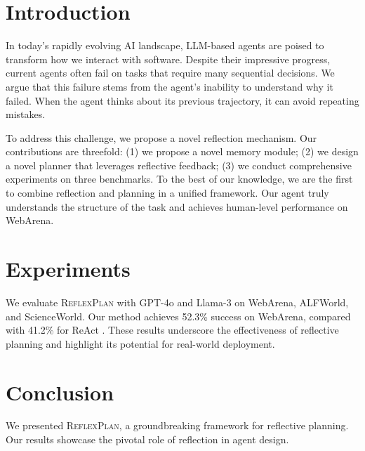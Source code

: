 \documentclass{article}
\begin{document}
\begin{abstract}
Large language model (LLM) agents have shown remarkable capabilities across a diverse range of tasks. However, they often struggle with long-horizon planning in complex environments. In this paper, we introduce \textsc{ReflexPlan}, a novel framework that empowers agents to seamlessly reflect on past failures and refine their plans. Extensive experiments demonstrate that our approach achieves state-of-the-art performance, significantly outperforming existing baselines. Our work paves the way for truly autonomous, general-purpose agents.
\end{abstract}

\section{Introduction}
In today's rapidly evolving AI landscape, LLM-based agents are poised to transform how we interact with software. Despite their impressive progress, current agents often fail on tasks that require many sequential decisions. We argue that this failure stems from the agent's inability to understand why it failed. When the agent thinks about its previous trajectory, it can avoid repeating mistakes.

To address this challenge, we propose a novel reflection mechanism. Our contributions are threefold: (1) we propose a novel memory module; (2) we design a novel planner that leverages reflective feedback; (3) we conduct comprehensive experiments on three benchmarks. To the best of our knowledge, we are the first to combine reflection and planning in a unified framework. Our agent truly understands the structure of the task and achieves human-level performance on WebArena.

\section{Experiments}
We evaluate \textsc{ReflexPlan} with GPT-4o and Llama-3 on WebArena, ALFWorld, and ScienceWorld. Our method achieves 52.3\% success on WebArena, compared with 41.2\% for ReAct \cite{yao2023react}. These results underscore the effectiveness of reflective planning and highlight its potential for real-world deployment.

\section{Conclusion}
We presented \textsc{ReflexPlan}, a groundbreaking framework for reflective planning. Our results showcase the pivotal role of reflection in agent design.
\end{document}
